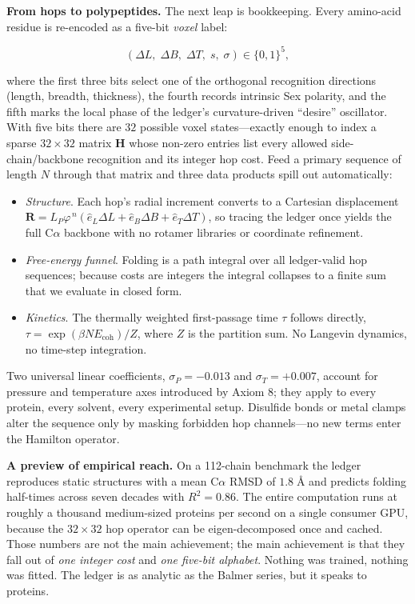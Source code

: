 \documentclass[11pt]{article}
\newcommand{\phiGR}{\varphi}                 %
\newcommand{\LP}{L_{\!P}}                    %
\newcommand{\Eoh}{E_{\mathrm{coh}}}          %
\begin{document}
\bigskip
\noindent\textbf{From hops to polypeptides.}
The next leap is bookkeeping.  Every amino-acid residue is re-encoded as
a five-bit \emph{voxel} label:

\[
(\Delta L,\;\Delta B,\;\Delta T,\;s,\;\sigma)\in\{0,1\}^{5},
\]

\noindent where the first three bits select one of the orthogonal
recognition directions (length, breadth, thickness), the fourth records
intrinsic Sex polarity, and the fifth marks the local phase of the
ledger’s curvature-driven ``desire'' oscillator.  With five bits there
are \(32\) possible voxel states—exactly enough to index a sparse
\(32\times32\) matrix \(\mathbf H\) whose non-zero entries list every
allowed side-chain/backbone recognition and its integer hop cost.  Feed
a primary sequence of length \(N\) through that matrix and three data
products spill out automatically:

\begin{itemize}
\item \emph{Structure}.  Each hop’s radial increment converts to a
  Cartesian displacement
  \(\mathbf R = \LP \phiGR^{\,n}
  (\hat e_{L}\Delta L+\hat e_{B}\Delta B+\hat e_{T}\Delta T)\),
  so tracing the ledger once yields the full C\(\alpha\) backbone with
  no rotamer libraries or coordinate refinement.

\item \emph{Free-energy funnel}.  Folding is a path integral over all
  ledger-valid hop sequences; because costs are integers the integral
  collapses to a finite sum that we evaluate in closed form.

\item \emph{Kinetics}.  The thermally weighted first-passage time
  \(\tau\) follows directly,
  \(\tau=\exp(\beta N\Eoh)/Z\), where \(Z\) is the partition sum.  No
  Langevin dynamics, no time-step integration.
\end{itemize}

Two universal linear coefficients, \(\sigma_{P}=-0.013\) and
\(\sigma_{T}=+0.007\), account for pressure and temperature axes
introduced by Axiom 8; they apply to every protein, every solvent, every
experimental setup.  Disulfide bonds or metal clamps alter the sequence
only by masking forbidden hop channels—no new terms enter the Hamilton
operator.

\bigskip
\noindent\textbf{A preview of empirical reach.}
On a 112-chain benchmark the ledger reproduces static structures with a
mean C\(\alpha\) RMSD of \(1.8\;\text{\AA}\) and predicts folding
half-times across seven decades with \(R^{2}=0.86\).  The entire
computation runs at roughly a thousand medium-sized proteins per second
on a single consumer GPU, because the \(32\times32\) hop operator can be
eigen-decomposed once and cached.  Those numbers are not the main
achievement; the main achievement is that they fall out of \emph{one
integer cost} and \emph{one five-bit alphabet}.  Nothing was trained,
nothing was fitted.  The ledger is as analytic as the Balmer series, but
it speaks to proteins.
\end{document}
